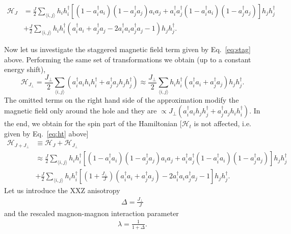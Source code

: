 \documentclass[%
 reprint,
 amsmath,amssymb,
 aps,
prl,
]{revtex4-1}
\newcommand{\mean}[1]{\langle#1\rangle}
\begin{document}
%
\begin{equation}
	\begin{aligned}
	\mathcal{H}_{J} &= \frac{J}{2}\sum_{\mean{i,j}} h_i h_i^\dag \left[(1 - a_i^\dag a_i)(1 - a_j^\dag a_j)a_i a_j + a_i^\dag a_j^\dag (1 - a_i^\dag a_i)(1 - a_j^\dag a_j) \right] h_j h_j^\dag \\
	&+ \frac{J}{2} \sum_{\mean{i,j}} h_i h_i^\dag \left(a_i^\dag a_i + a_j^\dag a_j - 2 a_i^\dag a_i a_j^\dag a_j - 1\right) h_j h_j^\dag.
	\end{aligned}
	\label{eq:hj}
\end{equation}

Now let us investigate the staggered magnetic field term given by Eq.~\eqref{eq:stag} above.
%
Performing the same set of transformations we obtain (up to a constant energy shift),
%
\begin{equation}
	\mathcal{H}_{J_\perp} = \frac{J_\perp}{2} \sum_{\mean{i,j}} 
	\left(a_i^\dag a_i h_i h_i^\dag + a_j^\dag a_j h_j h_j^\dag \right) \approx \frac{J_\perp}{2} \sum_{\mean{i,j}} 
	h_i h_i^\dag \left(a_i^\dag a_i + a_j^\dag a_j \right) h_j h_j^\dag.
\end{equation}
%
The omitted terms on the right hand side of the approximation modify the magnetic field only around the hole and they are $\propto J_\perp \left( a_i^\dag a_i h_j h_j^\dag + a_j^\dag a_j h_i h_i^\dag \right)$. In the end, we obtain for the spin part of the Hamiltonian [$\mathcal{H}_t$ is not affected, i.e. given by Eq.~\eqref{eq:ht} above]
%
\begin{equation}
	\begin{aligned}
	\mathcal{H}_{J+J_\perp} &\equiv \mathcal{H}_{J} + \mathcal{H}_{J_\perp} \\
	&\approx \frac{J}{2}\sum_{\mean{i,j}} h_i h_i^\dag \left[(1 - a_i^\dag a_i)(1 - a_j^\dag a_j)a_i a_j + a_i^\dag a_j^\dag (1 - a_i^\dag a_i)(1 - a_j^\dag a_j) \right] h_j h_j^\dag \\
	&+ \frac{J}{2} \sum_{\mean{i,j}} h_i h_i^\dag \left[\left(1+\frac{J_\perp}{J}\right)\left(a_i^\dag a_i + a_j^\dag a_j\right) - 2 a_i^\dag a_i a_j^\dag a_j - 1\right] h_j h_j^\dag.
	\end{aligned}
\end{equation}
%
Let us introduce the XXZ anisotropy 
\begin{align}
\Delta = \frac{J_\perp}{J} 
\end{align}
and the  rescaled magnon-magnon interaction parameter 
\begin{align}
\lambda = \frac{1} {1+\Delta}.
\end{align}
\end{document}
